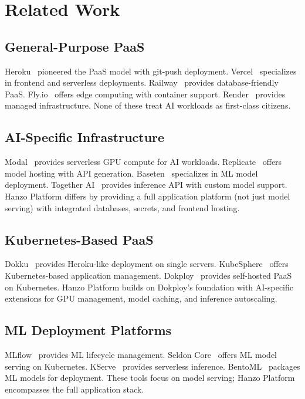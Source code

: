 \section{Related Work}

\label{sec:related}

\subsection{General-Purpose PaaS}

Heroku~\cite{heroku2007} pioneered the PaaS model with git-push deployment. Vercel~\cite{vercel2020} specializes in frontend and serverless deployments. Railway~\cite{railway2021} provides database-friendly PaaS. Fly.io~\cite{flyio2020} offers edge computing with container support. Render~\cite{render2019} provides managed infrastructure. None of these treat AI workloads as first-class citizens.

\subsection{AI-Specific Infrastructure}

Modal~\cite{modal2023} provides serverless GPU compute for AI workloads. Replicate~\cite{replicate2022} offers model hosting with API generation. Baseten~\cite{baseten2022} specializes in ML model deployment. Together AI~\cite{together2023} provides inference API with custom model support. Hanzo Platform differs by providing a full application platform (not just model serving) with integrated databases, secrets, and frontend hosting.

\subsection{Kubernetes-Based PaaS}

Dokku~\cite{dokku2013} provides Heroku-like deployment on single servers. KubeSphere~\cite{kubesphere2020} offers Kubernetes-based application management. Dokploy~\cite{dokploy2024} provides self-hosted PaaS on Kubernetes. Hanzo Platform builds on Dokploy's foundation with AI-specific extensions for GPU management, model caching, and inference autoscaling.

\subsection{ML Deployment Platforms}

MLflow~\cite{mlflow2018} provides ML lifecycle management. Seldon Core~\cite{seldon2019} offers ML model serving on Kubernetes. KServe~\cite{kserve2021} provides serverless inference. BentoML~\cite{bentoml2022} packages ML models for deployment. These tools focus on model serving; Hanzo Platform encompasses the full application stack.

